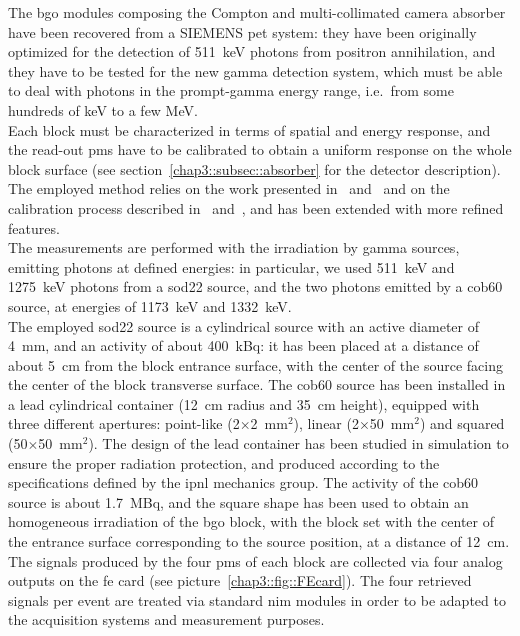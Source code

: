The \gls{bgo} modules composing the Compton and multi-collimated camera absorber have been recovered from a SIEMENS \gls{pet} system: they have been originally optimized for the detection of 511~keV photons from positron annihilation, and they have to be tested for the new gamma detection system, which must be able to deal with photons in the prompt-gamma energy range, i.e.~from some hundreds of keV to a few MeV.\\ 
Each block must be characterized in terms of spatial and energy response, and the read-out \glspl{pm} have to be calibrated to obtain a uniform response on the whole block surface (see section~\ref{chap3::subsec::absorber} for the detector description). The employed method relies on the work presented in~\cite{Rogers1994} and~\cite{Tornai1994} and on the calibration process described in~\cite{Golnik2015} and~\cite{HuesoGonzalez2015}, and has been extended with more refined features.\\
The measurements are performed with the irradiation by gamma sources, emitting photons at defined energies: in particular, we used 511~keV and 1275~keV photons from a \gls{sod22} source, and the two photons emitted by a \gls{cob60} source, at energies of 1173~keV and 1332~keV.\\
The employed \gls{sod22} source is a cylindrical source with an active diameter of 4~mm, and an activity of about 400~kBq: it has been placed at a distance of about 5~cm from the block entrance surface, with the center of the source facing the center of the block transverse surface. The \gls{cob60} source has been installed in a lead cylindrical container (12~cm radius and 35~cm height), equipped with three different apertures: point-like (2$\times$2~mm$^2$), linear (2$\times$50~mm$^2$) and squared (50$\times$50~mm$^2$). The design of the lead container has been studied in simulation to ensure the proper radiation protection, and produced according to the specifications defined by the \gls{ipnl} mechanics group. The activity of the \gls{cob60} source is about 1.7~MBq, and the square shape has been used to obtain an homogeneous irradiation of the \gls{bgo} block, with the block set with the center of the entrance surface corresponding to the source position, at a distance of 12~cm.\\
The signals produced by the four \glspl{pm} of each block are collected via four analog outputs on the \gls{fe} card (see picture~\ref{chap3::fig::FEcard}). The four retrieved signals per event are treated via standard \gls{nim} modules in order to be adapted to the acquisition systems and measurement purposes.\\
